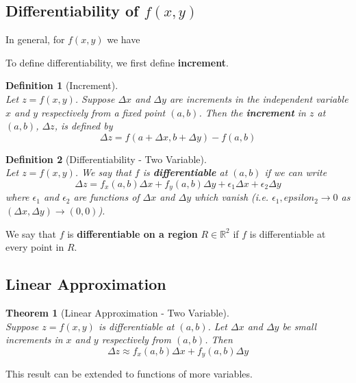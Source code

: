 \documentclass[12pt]{article}
\newtheorem{definition}{Definition}[section]
\newtheorem{theorem}{Theorem}[section]
\theoremstyle{definition}
\begin{document}
\subsection{Differentiability of $f(x,y)$}
In general, for $f(x,y)$ we have
\begin{center}
\end{center}
To define differentiability, we first define \textbf{increment}.
\begin{definition}[Increment]\hfill\\\normalfont Let $z=f(x,y)$. Suppose $\Delta x$ and $\Delta y$ are increments in the \textit{independent} variable $x$ and $y$ respectively from a fixed point $(a,b)$. Then the \textbf{increment} in $z$ at $(a,b)$, $\Delta z$, is defined by
\[
\Delta z = f(a+\Delta x, b+\Delta y)-f(a,b)
\]
\end{definition}
\begin{definition}[Differentiability - Two Variable]
\hfill\\\normalfont Let $z=f(x,y)$. We say that $f$ is \textbf{differentiable} at $(a,b)$ if we can write
\[
\Delta z = f_x(a,b)\Delta x+f_y(a,b)\Delta y+\epsilon_1\Delta x + \epsilon_2\Delta y
\]
where $\epsilon_1$ and $\epsilon_2$ are functions of $\Delta x$ and $\Delta y$ which vanish (i.e. $\epsilon_1,epsilon_2\to 0$ as $(\Delta x,\Delta y)\to(0,0)$).
\end{definition}
We say that $f$ is \textbf{differentiable on a region} $R\in\mathbb{R}^2$ if $f$ is differentiable at every point in $R$.
\subsection{Linear Approximation}
\begin{theorem}[Linear Approximation - Two Variable]
\hfill\\\normalfont Suppose $z=f(x,y)$ is \textit{differentiable} at $(a,b)$. Let $\Delta x$ and $\Delta y$ be small increments in $x$ and $y$ respectively from $(a,b)$. Then
\[
\Delta z \approx f_x(a,b)\Delta x+f_y(a,b)\Delta y
\]
\end{theorem}
This result can be extended to functions of more variables.
\end{document}
